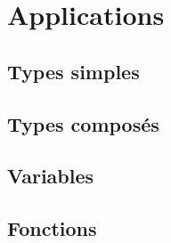 \section{Applications}
\subsection{Types simples}
\setcounter{thequestion}{0}

\subsection{Types composés}
\setcounter{thequestion}{0}

\subsection{Variables}
\setcounter{thequestion}{0}

\subsection{Fonctions}
\setcounter{thequestion}{0}

